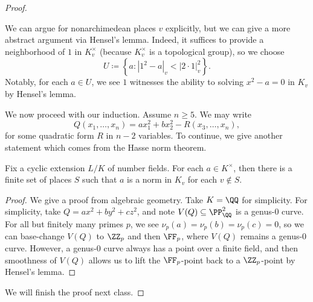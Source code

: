 \documentclass[../notes.tex]{subfiles}
\begin{document}
\begin{proof}
\begin{itemize}
		We can argue for nonarchimedean places $v$ explicitly, but we can give a more abstract argument via Hensel's lemma. Indeed, it suffices to provide a neighborhood of $1$ in $K_v^\times$ (because $K_v^\times$ is a topological group), so we choose
		\[U\coloneqq\left\{a:\left|1^2-a\right|_v<|2\cdot1|_v^2\right\}.\]
		Notably, for each $a\in U$, we see $1$ witnesses the ability to solving $x^2-a=0$ in $K_v$ by Hensel's lemma.
	\end{itemize}
	We now proceed with our induction. Assume $n\ge 5$. We may write
	\[Q(x_1,\ldots,x_n)=ax_1^2+bx_2^2-R(x_3,\ldots,x_n),\]
	for some quadratic form $R$ in $n-2$ variables. To continue, we give another statement which comes from the Hasse norm theorem.
	\begin{theorem}
		Fix a cyclic extension $L/K$ of number fields. For each $a\in K^\times$, then there is a finite set of places $S$ such that $a$ is a norm in $K_v$ for each $v\notin S$.
	\end{theorem}
	\begin{proof}
		We give a proof from algebraic geometry. Take $K=\QQ$ for simplicity. For simplicity, take $Q=ax^2+by^2+cz^2$, and note $V(Q)\subseteq\PP^2_\QQ$ is a genus-$0$ curve. For all but finitely many primes $p$, we see $\nu_p(a)=\nu_p(b)=\nu_p(c)=0$, so we can base-change $V(Q)$ to $\ZZ_p$ and then $\FF_p$, where $V(Q)$ remains a genus-$0$ curve. However, a genus-$0$ curve always has a point over a finite field, and then smoothness of $V(Q)$ allows us to lift the $\FF_p$-point back to a $\ZZ_p$-point by Hensel's lemma.
	\end{proof}
	We will finish the proof next class.
\end{proof}
\end{document}
